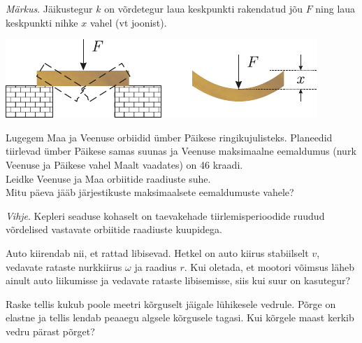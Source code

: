 \documentclass[10pt]{article}
\begin{document}
{\emph{Märkus}. Jäikustegur $k$ on võrdetegur laua keskpunkti rakendatud jõu $F$ ning laua keskpunkti nihke $x$ vahel (vt joonist).

\begin{center}
	\includegraphics[width=0.8\linewidth]{2007-lahg-06-yl}
\end{center}
\probend
\bigskip


Lugegem Maa ja Veenuse orbiidid ümber Päikese ringikujulisteks. Planeedid tiirlevad ümber Päikese samas suunas ja Veenuse maksimaalne eemaldumus (nurk Veenuse ja Päikese vahel Maalt vaadates) on 46 kraadi.\\
\osa Leidke Veenuse ja Maa orbiitide raadiuste suhe.\\
\osa Mitu päeva jääb järjestikuste maksimaalsete eemaldumuste vahele?

\emph{Vihje}. Kepleri seaduse kohaselt on taevakehade tiirlemisperioodide ruudud võrdelised vastavate orbiitide raadiuste kuupidega.
\probend
\bigskip


Auto kiirendab nii, et rattad libisevad. Hetkel on auto kiirus stabiilselt $v$, vedavate rataste nurkkiirus $\omega$ ja raadius $r$. Kui oletada, et mootori võimsus läheb ainult auto liikumisse ja vedavate rataste libisemisse, siis kui suur on kasutegur?
\probend
\bigskip


Raske tellis kukub poole meetri kõrguselt jäigale lühikesele vedrule. Põrge
on elastne ja tellis lendab peaaegu algsele kõrgusele tagasi. Kui
kõrgele maast kerkib vedru pärast põrget?
\probend
\bigskip


}
\end{document}
